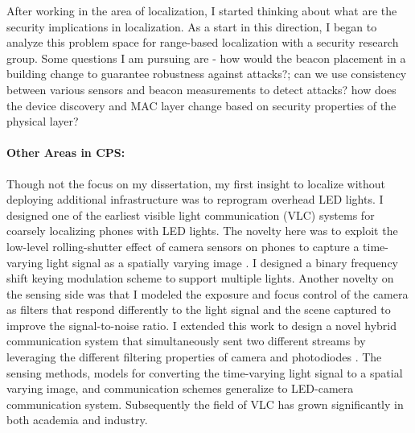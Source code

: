 \documentclass[11pt]{article}
\begin{document}
After working in the area of localization, I started thinking about what are the security implications in localization. %
As a start in this direction, I began to analyze this problem space for
range-based localization with a security research group.  Some questions I am pursuing are - how would the beacon placement in a building change
to guarantee robustness against attacks?; can we use
consistency between various sensors and beacon measurements to detect attacks? 
how does the device discovery and MAC layer change based on security
properties of the physical layer? %





\paragraph{Other Areas in CPS: }
Though not the focus on my dissertation, my first insight to localize without deploying additional infrastructure was to reprogram overhead LED lights. 
I designed one of the earliest visible light communication (VLC) systems for coarsely localizing phones with LED lights. %
The novelty here was to exploit the low-level rolling-shutter effect of camera sensors on phones to capture a time-varying light signal as a spatially varying image \cite{rajagopal2014visual, rajagopal2014demonstration}. 
I designed a binary frequency shift keying modulation scheme to support multiple lights.  Another novelty on the sensing side was that I modeled the exposure and focus control of the camera as filters that respond differently to the light signal and the scene captured to improve the signal-to-noise ratio. I extended this work to design a novel hybrid communication system that simultaneously sent two different streams by leveraging the different filtering properties of camera and photodiodes \cite{rajagopal2014hybrid}. The sensing methods, models for converting the time-varying light signal to a spatial varying image, and communication schemes generalize to LED-camera communication system. Subsequently the field of VLC has grown significantly in both academia and industry.\\
\end{document}
